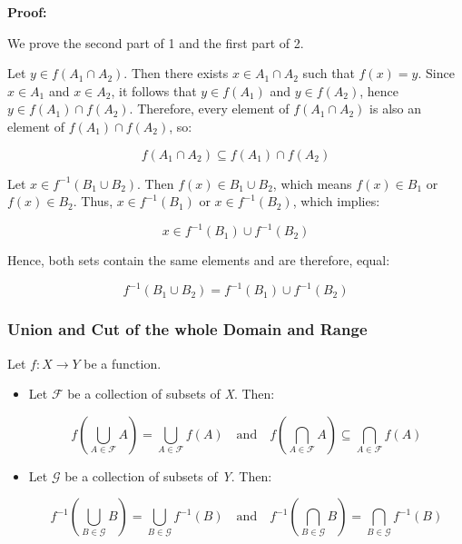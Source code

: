 \textbf{Proof:}

We prove the second part of 1 and the first part of 2.
\vspace{\baselineskip}

Let \( y \in f(A_1 \cap A_2) \). Then there exists \( x \in A_1 \cap A_2 \) such that 
\( f(x) = y \). Since \( x \in A_1 \) and \( x \in A_2 \), it follows that \( y \in f(A_1) \) 
and \( y \in f(A_2) \), hence \( y \in f(A_1) \cap f(A_2) \). Therefore, every element of 
\( f(A_1 \cap A_2) \) is also an element of \( f(A_1) \cap f(A_2) \), so:

\[
	f(A_1 \cap A_2) \subseteq f(A_1) \cap f(A_2)
\]

Let \( x \in f^{-1} (B_1 \cup B_2) \). Then \( f(x) \in B_1 \cup B_2 \), which means \( f(x) \in B_1 \) 
or \( f(x) \in B_2 \). Thus, \( x \in f^{-1}(B_1) \) 
or \( x \in f^{-1}(B_2) \), which implies:
	      
\[
	 x \in f^{-1}(B_1) \cup f^{-1}(B_2)
\]

Hence, both sets contain the same elements and are therefore, equal:
	      
\[
	f^{-1}(B_1 \cup B_2) = f^{-1}(B_1) \cup f^{-1}(B_2)
\]

\QED

\subsubsection{Union and Cut of the whole Domain and Range}

Let \( f : X \to Y \) be a function.

\begin{itemize}

	\item Let \( \mathcal{F} \) be a collection of subsets of \emph{X}. Then:

   	      \[
		      f\left( \bigcup_{A \in \mathcal{F}} A \right) = \bigcup_{A \in \mathcal{F}} f(A)
		      \quad \text{and} \quad
		      f\left( \bigcap_{A \in \mathcal{F}} A \right) \subseteq \bigcap_{A \in \mathcal{F}} f(A)
	      \]

	\item Let \( \mathcal{G} \) be a collection of subsets of \emph{Y}. Then:

	      \[
		      f^{-1}\left( \bigcup_{B \in \mathcal{G}} B \right) = \bigcup_{B \in \mathcal{G}} f^{-1}(B)
		      \quad \text{and} \quad
		      f^{-1}\left( \bigcap_{B \in \mathcal{G}} B \right) = \bigcap_{B \in \mathcal{G}} f^{-1}(B)
	      \]

\end{itemize}

